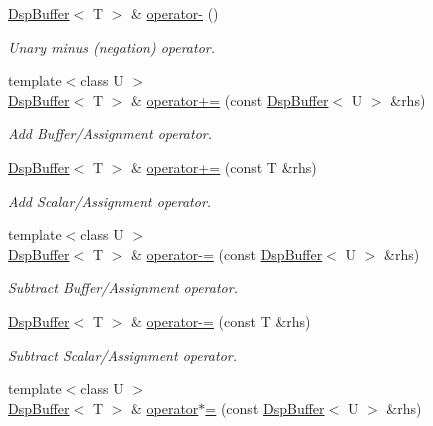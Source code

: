 \begin{DoxyCompactItemize}
\hyperlink{class_smart_dsp_1_1_dsp_buffer}{Dsp\+Buffer}$<$ T $>$ \& \hyperlink{class_smart_dsp_1_1_dsp_buffer_a808b7f21c55dac554a5499f909b99ee7}{operator-\/} ()
\begin{DoxyCompactList}\small\item\em Unary minus (negation) operator. \end{DoxyCompactList}\item 
{\footnotesize template$<$class U $>$ }\\\hyperlink{class_smart_dsp_1_1_dsp_buffer}{Dsp\+Buffer}$<$ T $>$ \& \hyperlink{class_smart_dsp_1_1_dsp_buffer_a1f82292301361be32e2b8ac8521aa22b}{operator+=} (const \hyperlink{class_smart_dsp_1_1_dsp_buffer}{Dsp\+Buffer}$<$ U $>$ \&rhs)
\begin{DoxyCompactList}\small\item\em Add Buffer/\+Assignment operator. \end{DoxyCompactList}\item 
\hyperlink{class_smart_dsp_1_1_dsp_buffer}{Dsp\+Buffer}$<$ T $>$ \& \hyperlink{class_smart_dsp_1_1_dsp_buffer_a3ea52379f390c48af5db2cc19f9555d2}{operator+=} (const T \&rhs)
\begin{DoxyCompactList}\small\item\em Add Scalar/\+Assignment operator. \end{DoxyCompactList}\item 
{\footnotesize template$<$class U $>$ }\\\hyperlink{class_smart_dsp_1_1_dsp_buffer}{Dsp\+Buffer}$<$ T $>$ \& \hyperlink{class_smart_dsp_1_1_dsp_buffer_ad69dc68623269e99dc24debad52bfa43}{operator-\/=} (const \hyperlink{class_smart_dsp_1_1_dsp_buffer}{Dsp\+Buffer}$<$ U $>$ \&rhs)
\begin{DoxyCompactList}\small\item\em Subtract Buffer/\+Assignment operator. \end{DoxyCompactList}\item 
\hyperlink{class_smart_dsp_1_1_dsp_buffer}{Dsp\+Buffer}$<$ T $>$ \& \hyperlink{class_smart_dsp_1_1_dsp_buffer_aee029f41878033fe1072759a1b1f90e5}{operator-\/=} (const T \&rhs)
\begin{DoxyCompactList}\small\item\em Subtract Scalar/\+Assignment operator. \end{DoxyCompactList}\item 
{\footnotesize template$<$class U $>$ }\\\hyperlink{class_smart_dsp_1_1_dsp_buffer}{Dsp\+Buffer}$<$ T $>$ \& \hyperlink{class_smart_dsp_1_1_dsp_buffer_a6e5da9f656e0d3f3ed986c1c42db8754}{operator$\ast$=} (const \hyperlink{class_smart_dsp_1_1_dsp_buffer}{Dsp\+Buffer}$<$ U $>$ \&rhs)

\end{DoxyCompactItemize}

